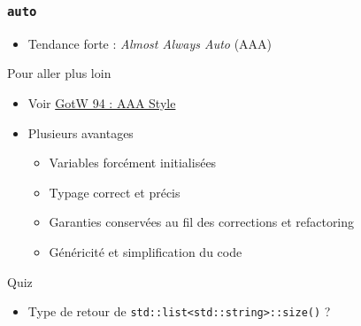\documentclass[C++.tex]{subfiles}
\begin{document}
\begin{frame}[fragile]
	\frametitle{\lstinline|auto|}
	\begin{itemize}
		\item Tendance forte : \textit{Almost Always Auto} (AAA)
	\end{itemize}

	\begin{block}{Pour aller plus loin}
		\begin{itemize}
			\item Voir \href{https://herbsutter.com/2013/08/12/gotw-94-solution-aaa-style-almost-always-auto/}{GotW 94 : AAA Style}
		\end{itemize}
	\end{block}

	\begin{itemize}
		\item Plusieurs avantages
		\begin{itemize}
			\item Variables forcément initialisées
			\item Typage correct et précis
			\item Garanties conservées au fil des corrections et refactoring
			\item Généricité et simplification du code
		\end{itemize}
	\end{itemize}

	\pause
	
	\begin{block}{Quiz}
		\begin{itemize}
			\item Type de retour de \lstinline|std::list<std::string>::size()| ?
		\end{itemize}
	\end{block}
\end{frame}
\end{document}

